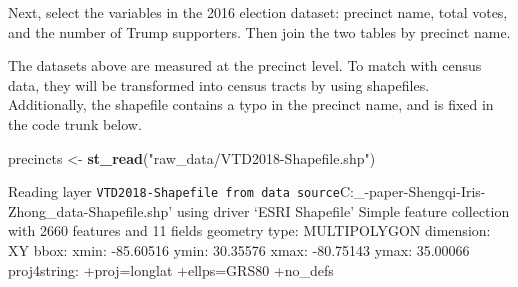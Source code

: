 \documentclass[
]{article}
\newenvironment{Shaded}{\begin{snugshade}}{\end{snugshade}}
\newcommand{\CommentTok}[1]{\textcolor[rgb]{0.56,0.35,0.01}{\textit{#1}}}
\newcommand{\DataTypeTok}[1]{\textcolor[rgb]{0.13,0.29,0.53}{#1}}
\newcommand{\DecValTok}[1]{\textcolor[rgb]{0.00,0.00,0.81}{#1}}
\newcommand{\KeywordTok}[1]{\textcolor[rgb]{0.13,0.29,0.53}{\textbf{#1}}}
\newcommand{\NormalTok}[1]{#1}
\newcommand{\OperatorTok}[1]{\textcolor[rgb]{0.81,0.36,0.00}{\textbf{#1}}}
\newcommand{\StringTok}[1]{\textcolor[rgb]{0.31,0.60,0.02}{#1}}
\begin{document}
Next, select the variables in the 2016 election dataset: precinct name,
total votes, and the number of Trump supporters. Then join the two
tables by precinct name.

\begin{Shaded}
\end{Shaded}

The datasets above are measured at the precinct level. To match with
census data, they will be transformed into census tracts by using
shapefiles. Additionally, the shapefile contains a typo in the precinct
name, and is fixed in the code trunk below.

\begin{Shaded}
\begin{Highlighting}[]
\NormalTok{precincts <-}\StringTok{ }\KeywordTok{st_read}\NormalTok{(}\StringTok{"raw_data/VTD2018-Shapefile.shp"}\NormalTok{)}
\end{Highlighting}
\end{Shaded}

Reading layer
\texttt{VTD2018-Shapefile\textquotesingle{}\ from\ data\ source}C:\Users\iris\_\OneDrive\Desktop\Smith{}\seminar-paper-Shengqi-Iris-Zhong\raw\_data-Shapefile.shp'
using driver `ESRI Shapefile' Simple feature collection with 2660
features and 11 fields geometry type: MULTIPOLYGON dimension: XY bbox:
xmin: -85.60516 ymin: 30.35576 xmax: -80.75143 ymax: 35.00066
proj4string: +proj=longlat +ellps=GRS80 +no\_defs

\begin{Shaded}
\end{Shaded}
\end{document}
